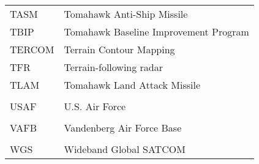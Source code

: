 \begin{supertabular}{ll}
TASM & Tomahawk Anti-Ship Missile \\
TBIP & Tomahawk Baseline Improvement Program \\
TERCOM & Terrain Contour Mapping \\
TFR & Terrain-following radar \\
TLAM & Tomahawk Land Attack Missile \\
\\
USAF & U.S. Air Force \\
\\
VAFB & Vandenberg Air Force Base \\
\\
WGS & Wideband Global SATCOM \\
\end{supertabular}
